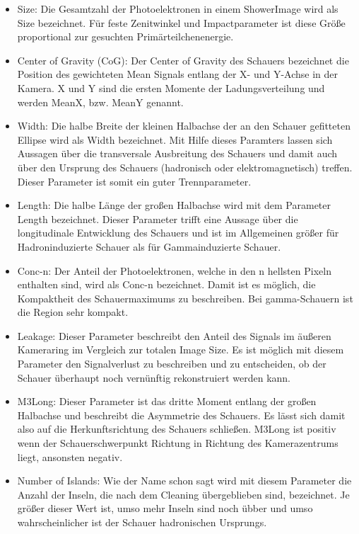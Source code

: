 \begin{itemize}
 \item Size: Die Gesamtzahl der Photoelektronen in einem ShowerImage wird als Size bezeichnet. Für feste Zenitwinkel und Impactparameter ist diese Größe proportional zur gesuchten Primärteilchenenergie.
 \item Center of Gravity (CoG): Der Center of Gravity des Schauers bezeichnet die Position des gewichteten Mean Signals entlang der X- und Y-Achse in der Kamera. 
 X und Y sind die ersten Momente der Ladungsverteilung und werden MeanX, bzw. MeanY genannt.
 \item Width: Die halbe Breite der kleinen Halbachse der an den Schauer gefitteten Ellipse wird als Width bezeichnet. 
 Mit Hilfe dieses Paramters lassen sich Aussagen über die transversale Ausbreitung des Schauers und damit auch über den Ursprung des Schauers (hadronisch oder elektromagnetisch) treffen. 
 Dieser Parameter ist somit ein guter Trennparameter.
 \item Length: Die halbe Länge der großen Halbachse wird mit dem Parameter Length bezeichnet.
 Dieser Parameter trifft eine Aussage über die longitudinale Entwicklung des Schauers und ist im Allgemeinen größer für Hadroninduzierte Schauer als für Gammainduzierte Schauer.
 \item Conc-n: Der Anteil der Photoelektronen, welche in den n hellsten Pixeln enthalten sind, wird als Conc-n bezeichnet.
 Damit ist es möglich, die Kompaktheit des Schauermaximums zu beschreiben. 
 Bei gamma-Schauern ist die Region sehr kompakt.
 \item Leakage: Dieser Parameter beschreibt den Anteil des Signals im äußeren Kameraring im Vergleich zur totalen Image Size.
 Es ist möglich mit diesem Parameter den Signalverlust zu beschreiben und zu entscheiden, ob der Schauer überhaupt noch vernünftig rekonstruiert werden kann.
 \item M3Long: Dieser Parameter ist das dritte Moment entlang der großen Halbachse und beschreibt die Asymmetrie des Schauers.
 Es lässt sich damit also auf die Herkunftsrichtung des Schauers schließen. 
 M3Long ist positiv wenn der Schauerschwerpunkt Richtung in Richtung des Kamerazentrums liegt, ansonsten negativ.
 \item Number of Islands: Wie der Name schon sagt wird mit diesem Parameter die Anzahl der Inseln, die nach dem Cleaning übergeblieben sind, bezeichnet. 
 Je größer dieser Wert ist, umso mehr Inseln sind noch übber und umso wahrscheinlicher ist der Schauer hadronischen Ursprungs.
\end{itemize}

